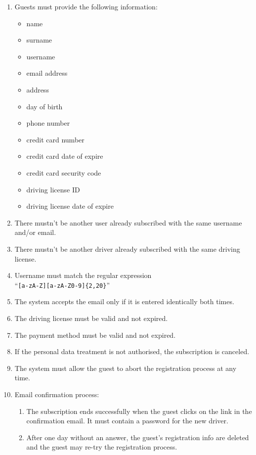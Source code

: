 \begin{enumerate}
	\item Guests must provide the following information:
	\begin{itemize}
		\item name
		\item surname
		\item username
		\item email address
		\item address
		\item day of birth
		\item phone number
		\item credit card number
		\item credit card date of expire
		\item credit card security code
		\item driving license ID
		\item driving license date of expire	
	\end{itemize}
	\item There mustn't be another user already subscribed with the same username and/or email. \label{f-sameinfo}
	\item There mustn't be another driver already subscribed with the same driving license. \label{f-samelicense}	
	\item Username must match the regular expression\\``\texttt{[a-zA-Z][a-zA-Z0-9]\{2,20\}}''    \label{f-usrn}
	\item The system accepts the email only if it is entered identically both times.\label{f-wrongmail}
	\item The driving license must be valid and not expired.
	\label{f-licenseexp}
	\item The payment method must be valid and not expired.
	\label{f-cc}
	\item If the personal data treatment is not authorised, the subscription is canceled. \label{f-dataTreat}
	\item The system must allow the guest to abort the registration process at any time.
	\item Email confirmation process:
	\begin{enumerate}
		\item The subscription ends successfully when the guest clicks on the link in the confirmation email. It must contain a password for the new driver.
		\item After one day without an answer, the guest's registration info are deleted and the guest may re-try the registration process.  \label{f-confirm}
	\end{enumerate}
\end{enumerate}

